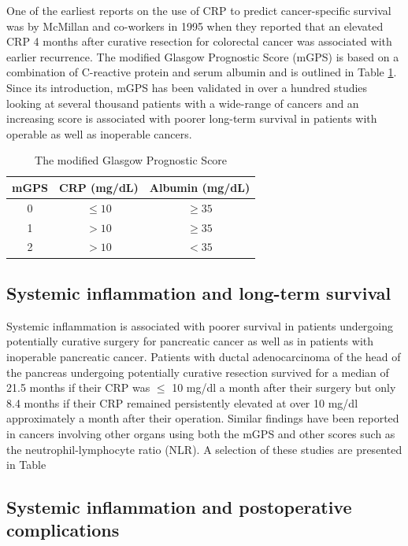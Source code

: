 One of the earliest reports on the use of CRP to predict cancer-specific survival was by McMillan and co-workers in 1995 when they reported that an elevated CRP 4 months after curative resection for colorectal cancer was associated with earlier recurrence.\parencite{mcmillan_prospective_1995} The modified Glasgow Prognostic Score (mGPS)\parencite{elahi_score_2004} is based on a combination of C-reactive protein and serum albumin and is outlined in Table \ref{table:mGPS}. Since its introduction, mGPS has been validated in over a hundred studies looking at several thousand patients with a wide-range of cancers and an increasing score is associated with poorer long-term survival in patients with operable as well as inoperable cancers.

\begin{table}[h]
	\centering
	\caption{The modified Glasgow Prognostic Score}
	\label{table:mGPS}
	\begin{tabular}{c c c}
		mGPS & CRP (mg/dL) & Albumin  (mg/dL) \\ \hline
		 0   & $\leq 10$   & $\geq 35$        \\
		 1   & $> 10$      & $\geq 35$        \\
		 2   & $> 10$      & $< 35$
	\end{tabular}
\end{table}

\subsection{Systemic inflammation and long-term survival}
Systemic inflammation is associated with poorer survival in patients undergoing potentially curative surgery for pancreatic cancer \parencite{jamieson_systemic_2005,clark_preoperative_2007,bhatti_preoperative_2010} as well as in patients with inoperable pancreatic cancer.\parencite{glen_evaluation_2006} Patients with ductal adenocarcinoma of the head of the pancreas undergoing potentially curative resection survived for a median of 21.5 months if their CRP was $\leq$ 10 mg/dl a month after their surgery but only 8.4 months if their CRP remained persistently elevated at over 10 mg/dl approximately a month after their operation.\parencite{jamieson_systemic_2005} Similar findings have been reported in cancers involving other organs using both the mGPS and other scores such as the neutrophil-lymphocyte ratio (NLR). A selection of these studies are presented in Table %

\subsection{Systemic inflammation and postoperative complications}

